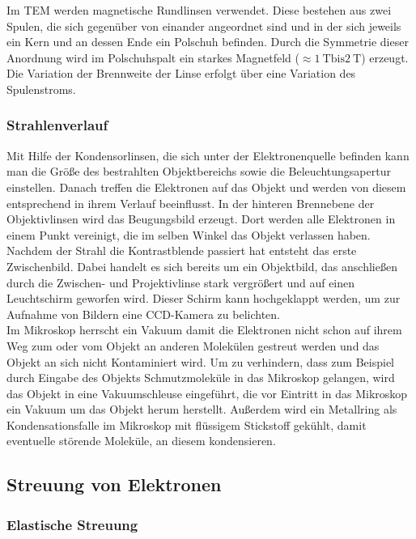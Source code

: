 \documentclass[slug=TEM, room=IFW, supervisor=?, coursedate=23.\ 01.\ 2020]{../../Lab_Report_LaTeX/lab_report}
\begin{document}
Im TEM werden magnetische Rundlinsen verwendet. Diese bestehen aus zwei Spulen, die sich
gegenüber von einander angeordnet sind und in der sich jeweils ein
Kern und an dessen Ende ein Polschuh befinden. Durch die Symmetrie dieser Anordnung wird im
Polschuhspalt ein starkes Magnetfeld (\(\approx \SI{1}{\tesla} \text{bis} \SI{2}{\tesla}\)) 
erzeugt.
Die Variation der Brennweite der Linse erfolgt über eine Variation des Spulenstroms.

\subsubsection{Strahlenverlauf}
\label{sec:verlauf}

Mit Hilfe der Kondensorlinsen, die sich unter der Elektronenquelle befinden kann man die Größe
des bestrahlten Objektbereichs sowie die Beleuchtungsapertur einstellen.
Danach treffen die Elektronen auf das Objekt und werden von diesem entsprechend in ihrem
Verlauf beeinflusst.
In der hinteren Brennebene der Objektivlinsen wird das Beugungsbild erzeugt. Dort werden alle
Elektronen in einem Punkt vereinigt, die im selben Winkel das Objekt verlassen haben.
Nachdem der Strahl die Kontrastblende passiert hat entsteht das erste Zwischenbild. Dabei handelt
es sich bereits um ein Objektbild, das anschließen durch die Zwischen- und Projektivlinse stark
vergrößert und auf einen Leuchtschirm geworfen wird. Dieser Schirm kann hochgeklappt werden, um
zur Aufnahme von Bildern eine CCD-Kamera zu belichten.\\

Im Mikroskop herrscht ein Vakuum damit die Elektronen nicht schon auf ihrem Weg zum oder vom
Objekt an anderen Molekülen gestreut werden und das Objekt an sich nicht Kontaminiert wird. Um zu 
verhindern, dass zum Beispiel durch Eingabe
des Objekts Schmutzmoleküle in das Mikroskop gelangen, wird das Objekt in eine Vakuumschleuse
eingeführt, die vor Eintritt in das Mikroskop ein Vakuum um das Objekt herum herstellt.
Außerdem wird ein Metallring als Kondensationsfalle im Mikroskop mit flüssigem Stickstoff 
gekühlt, damit eventuelle störende Moleküle, an diesem kondensieren.

\subsection{Streuung von Elektronen}
\label{sec:streuung}

\subsubsection{Elastische Streuung}
\label{sec:elast}
\end{document}
